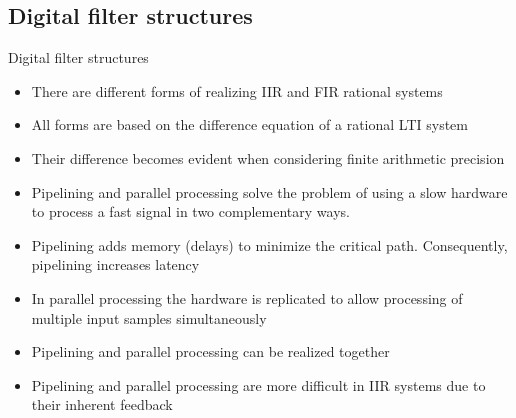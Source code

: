\documentclass[10pt]{beamer}
\begin{document}
%
\subsection{Digital filter structures}
\begin{frame}{Digital filter structures}
\begin{itemize}
	\item There are different forms of realizing IIR and FIR rational systems
	\item All forms are based on the difference equation of a rational LTI system
	\item Their difference becomes evident when considering finite arithmetic precision
	\item Pipelining and parallel processing solve the problem of using a slow hardware to process a fast signal in two complementary ways. 
	\item Pipelining adds memory (delays) to minimize the critical path. Consequently, pipelining increases latency
	\item In parallel processing the hardware is replicated to allow processing of multiple input samples simultaneously
	\item Pipelining and parallel processing can be realized together
	\item Pipelining and parallel processing are more difficult in IIR systems due to their inherent feedback
\end{itemize}
\end{frame}

%
\end{document}
